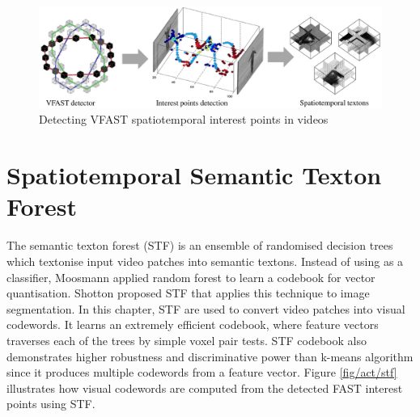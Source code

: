 \begin{figure}[ht]
	\centering
	\includegraphics[width=1\linewidth]{fig/act/fig2_new.pdf}
	\caption{Detecting VFAST spatiotemporal interest points in videos}
	\label{fig/act/fastest}
\end{figure}


\section{Spatiotemporal Semantic Texton Forest}
\label{sec/act/stf}

The semantic texton forest (STF) is an ensemble of randomised decision trees which textonise input video patches into semantic textons. Instead of using as a classifier, Moosmann \etal \cite{Moosmann2007} applied random forest to learn a codebook for vector quantisation. Shotton \etal \cite{Shotton2008} proposed STF that applies this technique to image segmentation. In this chapter, STF are used to convert video patches into visual codewords.  
It learns an extremely efficient codebook, where feature vectors traverses each of the trees by simple voxel pair tests. STF codebook also demonstrates higher robustness and discriminative power than k-means algorithm since it produces multiple codewords from a feature vector. Figure \ref{fig/act/stf} illustrates how visual codewords are computed from the detected FAST interest points using STF. 

